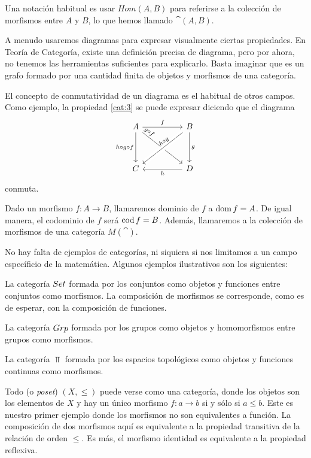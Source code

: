Una notación habitual es usar $Hom(A,B)$ para referirse a la colección de morfismos entre $A$ y $B$, lo que hemos llamado $\cat(A,B)$.

A menudo usaremos diagramas para expresar visualmente ciertas propiedades.
En Teoría de Categoría, existe una definición precisa de diagrama, pero por ahora, no tenemos las herramientas suficientes para explicarlo.
Basta imaginar que es un grafo formado por una cantidad finita de objetos y morfismos de una categoría.

El concepto de conmutatividad de un diagrama es el habitual de otros campos.
Como ejemplo, la propiedad \eqref{cat:3} se puede expresar diciendo que el diagrama
\[
\begin{tikzcd}
A \arrow[rr,"f"]\arrow[rrdd,pos=0.1,"g \circ f" sloped] \arrow[dd,"h\circ g \circ f" left] & & B \arrow[lldd,pos=0.4,"h\circ g" sloped, crossing over] \arrow[dd,"g"]\\
&\\
C & & D \arrow[ll,"h"]
\end{tikzcd}
\]
conmuta.

Dado un morfismo $f \colon A \to B$, llamaremos dominio de $f$ a $\operatorname{dom} f = A$.
De igual manera, el codominio de $f$ será $\operatorname{cod} f = B$. Además, llamaremos a la colección de morfismos de una categoría $M(\cat)$.

No hay falta de ejemplos de categorías, ni siquiera si nos limitamos a un campo específicio de la matemática.
Algunos ejemplos ilustrativos son los siguientes:

\begin{example}
La categoría ${Set}$ formada por los conjuntos como objetos y funciones entre conjuntos como morfismos.
La composición de morfismos se corresponde, como es de esperar, con la composición de funciones.
\end{example}

\begin{example}
La categoría ${Grp}$ formada por los grupos como objetos y homomorfismos entre grupos como morfismos.
\end{example}

\begin{example}
La categoría $\Top$ formada por los espacios topológicos como objetos y funciones continuas como morfismos.
\end{example}

\begin{example}
Todo  (o \emph{poset}) $(X,\leq)$ puede verse como una categoría, donde los objetos son los elementos de $X$ y hay un único morfismo $f \colon a \to b$ si y sólo si $a \leq b$.
Este es nuestro primer ejemplo donde los morfismos no son equivalentes a función.
La composición de dos morfismos aquí es equivalente a la propiedad transitiva de la relación de orden $\leq$.
Es más, el morfismo identidad es equivalente a la propiedad reflexiva.
\end{example}

